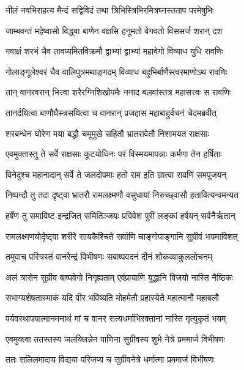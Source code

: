 \twolineshloka
{नीलं नवभिराहत्य मैन्दं सद्विविदं तथा}
{त्रिभिस्त्रिभिरमित्रघ्नस्तताप परमेषुभिः} %

\twolineshloka
{जाम्बवन्तं महेष्वासो विद्ध्वा बाणेन वक्षसि}
{हनूमतो वेगवतो विससर्ज शरान् दश} %

\twolineshloka
{गवाक्षं शरभं चैव तावप्यमितविक्रमौ}
{द्वाभ्यां द्वाभ्यां महावेगो विव्याध युधि रावणिः} %

\twolineshloka
{गोलाङ्गूलेश्वरं चैव वालिपुत्रमथाङ्गदम्}
{विव्याध बहुभिर्बाणैस्त्वरमाणोऽथ रावणिः} %

\twolineshloka
{तान् वानरवरान् भित्त्वा शरैरग्निशिखोपमैः}
{ननाद बलवांस्तत्र महासत्त्वः स रावणिः} %

\twolineshloka
{तानर्दयित्वा बाणौघैस्त्रसयित्वा च वानरान्}
{प्रजहास महाबाहुर्वचनं चेदमब्रवीत्} %

\twolineshloka
{शरबन्धेन घोरेण मया बद्धौ चमूमुखे}
{सहितौ भ्रातरावेतौ निशामयत राक्षसाः} %

\twolineshloka
{एवमुक्तास्तु ते सर्वे राक्षसाः कूटयोधिनः}
{परं विस्मयमापन्नाः कर्मणा तेन हर्षिताः} %

\twolineshloka
{विनेदुश्च महानादान् सर्वे ते जलदोपमाः}
{हतो राम इति ज्ञात्वा रावणिं समपूजयन्} %

\twolineshloka
{निष्पन्दौ तु तदा दृष्ट्वा भ्रातरौ रामलक्ष्मणौ}
{वसुधायां निरुच्छ्वासौ हतावित्यन्वमन्यत} %

\twolineshloka
{हर्षेण तु समाविष्ट इन्द्रजित् समितिञ्जयः}
{प्रविवेश पुरीं लङ्कां हर्षयन् सर्वनैर्ऋतान्} %

\twolineshloka
{रामलक्ष्मणयोर्दृष्ट्वा शरीरे सायकैश्चिते}
{सर्वाणि चाङ्गोपाङ्गानि सुग्रीवं भयमाविशत्} %

\twolineshloka
{तमुवाच परित्रस्तं वानरेन्द्रं विभीषणः}
{सबाष्पवदनं दीनं शोकव्याकुललोचनम्} %

\twolineshloka
{अलं त्रासेन सुग्रीव बाष्पवेगो निगृह्यताम्}
{एवंप्रायाणि युद्धानि विजयो नास्ति नैष्ठिकः} %

\twolineshloka
{सभाग्यशेषतास्माकं यदि वीर भविष्यति}
{मोहमेतौ प्रहास्येते महात्मानौ महाबलौ} %

\twolineshloka
{पर्यवस्थापयात्मानमनाथं मां च वानर}
{सत्यधर्माभिरक्तानां नास्ति मृत्युकृतं भयम्} %

\twolineshloka
{एवमुक्त्वा ततस्तस्य जलक्लिन्नेन पाणिना}
{सुग्रीवस्य शुभे नेत्रे प्रममार्ज विभीषणः} %

\twolineshloka
{ततः सलिलमादाय विद्यया परिजप्य च}
{सुग्रीवनेत्रे धर्मात्मा प्रममार्ज विभीषणः} %

